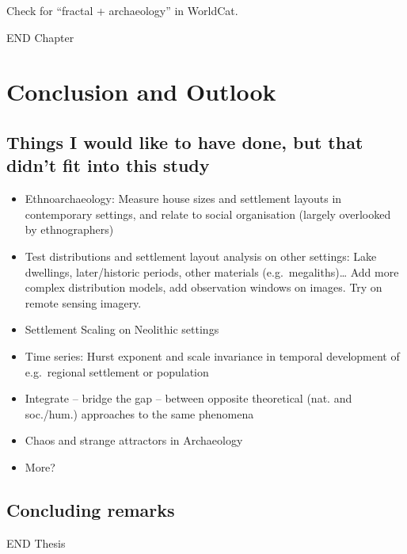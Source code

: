 \documentclass[
  12pt,
  a4paper, twoside]{book}
\providecommand{\tightlist}{%
  \setlength{\itemsep}{0pt}\setlength{\parskip}{0pt}}
\begin{document}
Check for ``fractal + archaeology'' in WorldCat.

END Chapter

\hypertarget{conclusion}{%
\chapter{Conclusion and Outlook}\label{conclusion}}

\hypertarget{things-i-would-like-to-have-done-but-that-didnt-fit-into-this-study}{%
\section{Things I would like to have done, but that didn't fit into this study}\label{things-i-would-like-to-have-done-but-that-didnt-fit-into-this-study}}

\begin{itemize}
\tightlist
\item
  Ethnoarchaeology: Measure house sizes and settlement layouts in contemporary settings, and relate to social organisation (largely overlooked by ethnographers)
\item
  Test distributions and settlement layout analysis on other settings: Lake dwellings, later/historic periods, other materials (e.g.~megaliths)\ldots{} Add more complex distribution models, add observation windows on images. Try on remote sensing imagery.
\item
  Settlement Scaling on Neolithic settings
\item
  Time series: Hurst exponent and scale invariance in temporal development of e.g.~regional settlement or population
\item
  Integrate -- bridge the gap -- between opposite theoretical (nat. and soc./hum.) approaches to the same phenomena
\item
  Chaos and strange attractors in Archaeology
\item
  More?
\end{itemize}

\hypertarget{concluding-remarks-1}{%
\section{Concluding remarks}\label{concluding-remarks-1}}

END Thesis
\end{document}
